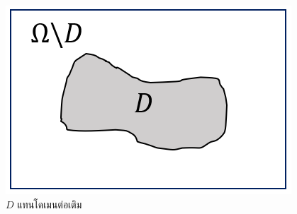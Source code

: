 \begin{figure}[H]
	\centering
	\includegraphics[width=0.375\linewidth]{image/sample-domain.png}
	\caption{$D$ แทนโดเมนต่อเติม}
	\label{figure:sample-domain}
\end{figure}